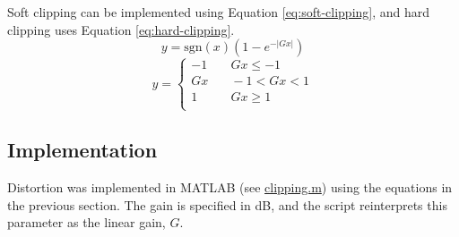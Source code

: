 Soft clipping can be implemented using Equation \ref{eq:soft-clipping}, and hard clipping uses Equation \ref{eq:hard-clipping}.
\begin{equation}
    y = \mathrm{sgn}(x) (1 - e^{-|Gx|})
    \label{eq:soft-clipping}
\end{equation}
\begin{equation}
    y =
    \begin{cases}
        -1 & \quad Gx \leq -1 \\
        Gx & \quad -1 < Gx < 1 \\
        1 & \quad Gx \geq 1 \\
    \end{cases}
    \label{eq:hard-clipping}
\end{equation}

\subsection{Implementation}
Distortion was implemented in MATLAB (see \href{run:../clipping.m}{clipping.m}) using the equations in the previous section. The gain is specified in dB, and the script reinterprets this parameter as the linear gain, $G$.


